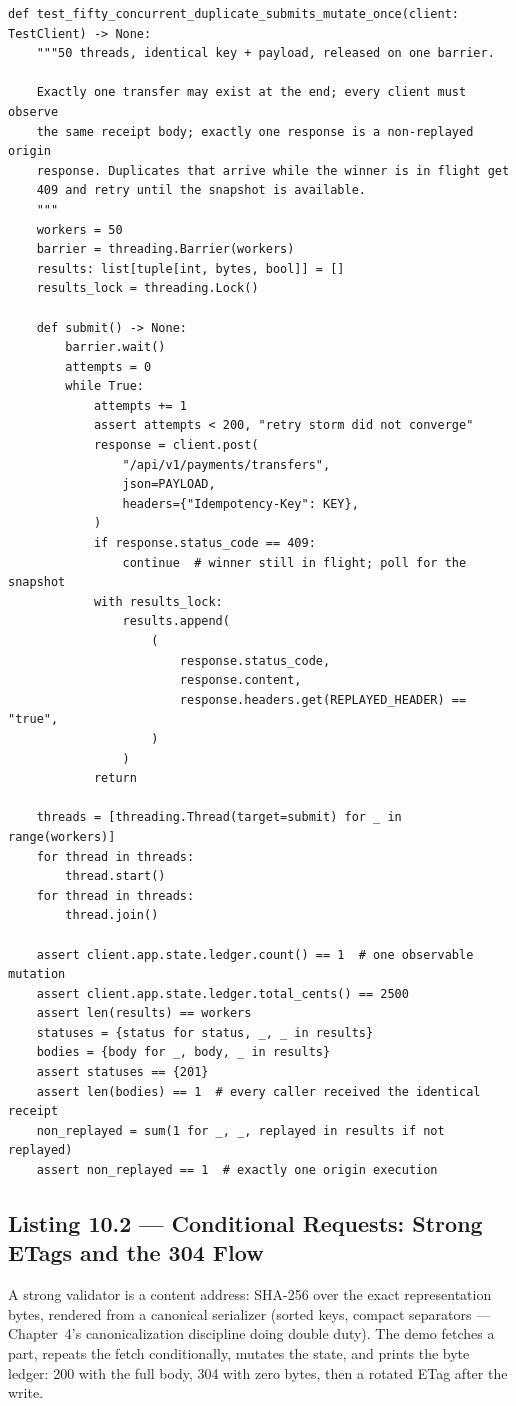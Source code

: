 \begin{verbatim}
def test_fifty_concurrent_duplicate_submits_mutate_once(client: TestClient) -> None:
    """50 threads, identical key + payload, released on one barrier.

    Exactly one transfer may exist at the end; every client must observe
    the same receipt body; exactly one response is a non-replayed origin
    response. Duplicates that arrive while the winner is in flight get
    409 and retry until the snapshot is available.
    """
    workers = 50
    barrier = threading.Barrier(workers)
    results: list[tuple[int, bytes, bool]] = []
    results_lock = threading.Lock()

    def submit() -> None:
        barrier.wait()
        attempts = 0
        while True:
            attempts += 1
            assert attempts < 200, "retry storm did not converge"
            response = client.post(
                "/api/v1/payments/transfers",
                json=PAYLOAD,
                headers={"Idempotency-Key": KEY},
            )
            if response.status_code == 409:
                continue  # winner still in flight; poll for the snapshot
            with results_lock:
                results.append(
                    (
                        response.status_code,
                        response.content,
                        response.headers.get(REPLAYED_HEADER) == "true",
                    )
                )
            return

    threads = [threading.Thread(target=submit) for _ in range(workers)]
    for thread in threads:
        thread.start()
    for thread in threads:
        thread.join()

    assert client.app.state.ledger.count() == 1  # one observable mutation
    assert client.app.state.ledger.total_cents() == 2500
    assert len(results) == workers
    statuses = {status for status, _, _ in results}
    bodies = {body for _, body, _ in results}
    assert statuses == {201}
    assert len(bodies) == 1  # every caller received the identical receipt
    non_replayed = sum(1 for _, _, replayed in results if not replayed)
    assert non_replayed == 1  # exactly one origin execution
\end{verbatim}

\subsection{Listing 10.2 --- Conditional Requests: Strong ETags and the 304 Flow}
\label{sec:ch10-listing2}

A strong validator is a content address: SHA-256 over the exact
representation bytes, rendered from a canonical serializer (sorted keys,
compact separators --- Chapter~4's canonicalization discipline doing double
duty). The demo fetches a part, repeats the fetch conditionally, mutates the
state, and prints the byte ledger: 200 with the full body, 304 with zero
bytes, then a rotated ETag after the write.


